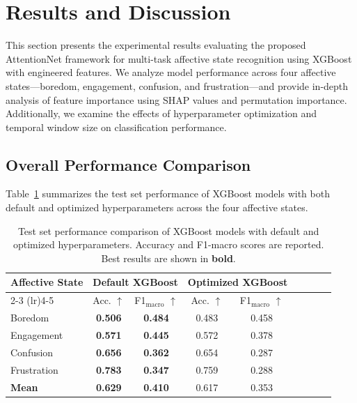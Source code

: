 \section{Results and Discussion}
\label{sec:results}

This section presents the experimental results evaluating the proposed AttentionNet framework for multi-task affective state recognition using XGBoost with engineered features. We analyze model performance across four affective states---boredom, engagement, confusion, and frustration---and provide in-depth analysis of feature importance using SHAP values and permutation importance. Additionally, we examine the effects of hyperparameter optimization and temporal window size on classification performance.

\subsection{Overall Performance Comparison}
\label{sec:overall-performance}

Table~\ref{tab:model-comparison} summarizes the test set performance of XGBoost models with both default and optimized hyperparameters across the four affective states.

\begin{table}[t]
\centering
\caption{Test set performance comparison of XGBoost models with default and optimized hyperparameters. Accuracy and F1-macro scores are reported. Best results are shown in \textbf{bold}.}
\label{tab:model-comparison}
\begin{tabular}{lcccccccc}
\toprule
\multirow{2}{*}{\textbf{Affective State}} & \multicolumn{2}{c}{\textbf{Default XGBoost}} & \multicolumn{2}{c}{\textbf{Optimized XGBoost}} \\
\cmidrule(lr){2-3} \cmidrule(lr){4-5}
& Acc. $\uparrow$ & F1$_{\text{macro}}$ $\uparrow$ & Acc. $\uparrow$ & F1$_{\text{macro}}$ $\uparrow$ \\
\midrule
Boredom & \textbf{0.506} & \textbf{0.484} & 0.483 & 0.458 \\
Engagement & \textbf{0.571} & \textbf{0.445} & 0.572 & 0.378 \\
Confusion & \textbf{0.656} & \textbf{0.362} & 0.654 & 0.287 \\
Frustration & \textbf{0.783} & \textbf{0.347} & 0.759 & 0.288 \\
\midrule
\textbf{Mean} & \textbf{0.629} & \textbf{0.410} & 0.617 & 0.353 \\
\bottomrule
\end{tabular}
\end{table}

